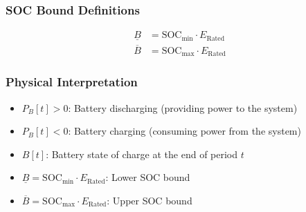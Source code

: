 \subsubsection{SOC Bound Definitions}
\begin{align}
\underline{B} &= \text{SOC}_{\min} \cdot E_{\text{Rated}} \\
\overline{B} &= \text{SOC}_{\max} \cdot E_{\text{Rated}}
\end{align}

\subsubsection{Physical Interpretation}
\begin{itemize}
    \item $P_B[t] > 0$: Battery discharging (providing power to the system)
    \item $P_B[t] < 0$: Battery charging (consuming power from the system)
    \item $B[t]$: Battery state of charge at the end of period $t$
    \item $\underline{B} = \text{SOC}_{\min} \cdot E_{\text{Rated}}$: Lower SOC bound
    \item $\overline{B} = \text{SOC}_{\max} \cdot E_{\text{Rated}}$: Upper SOC bound
\end{itemize}
